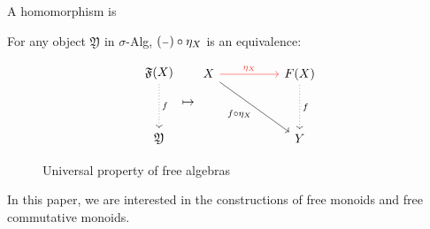 \begin{definition}[Homomorphism]
    A homomorphism is
\end{definition}

For any object \( \mathfrak{Y} \) in $\sigma$-Alg, $({\scriptstyle{-}}) \circ \eta_X$ is an equivalence:

\begin{figure}[H]
    \centering
    \[\begin{tikzcd}[ampersand replacement=\&]
            \mathfrak{F}(X) \\
            \\
            \mathfrak{Y}
            \arrow["f", dotted, from=1-1, to=3-1]
        \end{tikzcd}
        \mapsto
        \begin{tikzcd}[ampersand replacement=\&]
            X \&\& {F(X)} \\
            \\
            \&\& {Y}
            \arrow["\eta_X", color={rgb,255:red,255;green,54;blue,51}, from=1-1, to=1-3]
            \arrow["f \circ \eta_X"', from=1-1, to=3-3]
            \arrow["{f}", dotted, from=1-3, to=3-3]
        \end{tikzcd}\]
    \caption{Universal property of free algebras}
    \label{fig:universal-property}
\end{figure}



In this paper, we are interested in the constructions of free monoids and free commutative monoids.